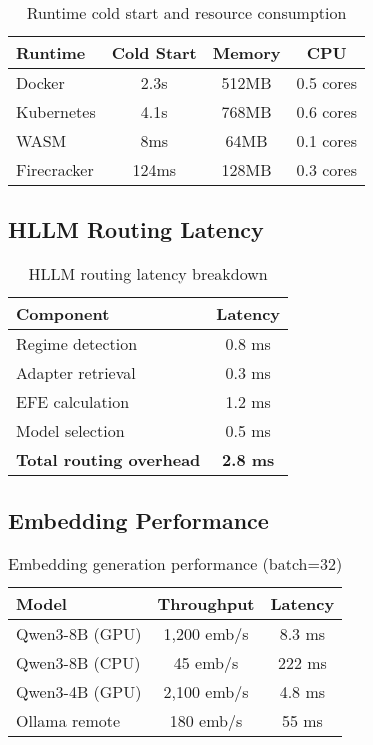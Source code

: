 \documentclass[11pt,twocolumn]{article}
\begin{document}
\begin{table}[h]
\centering
\small
\begin{tabular}{|l|c|c|c|}
\hline
\textbf{Runtime} & \textbf{Cold Start} & \textbf{Memory} & \textbf{CPU} \\
\hline
Docker & 2.3s & 512MB & 0.5 cores \\
Kubernetes & 4.1s & 768MB & 0.6 cores \\
WASM & 8ms & 64MB & 0.1 cores \\
Firecracker & 124ms & 128MB & 0.3 cores \\
\hline
\end{tabular}
\caption{Runtime cold start and resource consumption}
\label{tab:runtime_perf}
\end{table}

\subsection{HLLM Routing Latency}

\begin{table}[h]
\centering
\begin{tabular}{|l|c|}
\hline
\textbf{Component} & \textbf{Latency} \\
\hline
Regime detection & 0.8 ms \\
Adapter retrieval & 0.3 ms \\
EFE calculation & 1.2 ms \\
Model selection & 0.5 ms \\
\textbf{Total routing overhead} & \textbf{2.8 ms} \\
\hline
\end{tabular}
\caption{HLLM routing latency breakdown}
\label{tab:hllm_latency}
\end{table}

\subsection{Embedding Performance}

\begin{table}[h]
\centering
\small
\begin{tabular}{|l|c|c|}
\hline
\textbf{Model} & \textbf{Throughput} & \textbf{Latency} \\
\hline
Qwen3-8B (GPU) & 1,200 emb/s & 8.3 ms \\
Qwen3-8B (CPU) & 45 emb/s & 222 ms \\
Qwen3-4B (GPU) & 2,100 emb/s & 4.8 ms \\
Ollama remote & 180 emb/s & 55 ms \\
\hline
\end{tabular}
\caption{Embedding generation performance (batch=32)}
\label{tab:embedding_perf}
\end{table}
\end{document}
